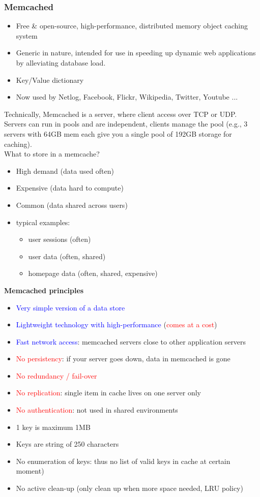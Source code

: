 \documentclass[10pt,a4paper]{article}
\begin{document}
\subsubsection{Memcached}
\begin{itemize}
	\item Free \& open-source, high-performance, distributed memory object caching system
	\item Generic in nature, intended for use in speeding up dynamic web applications by alleviating database load.
	\item Key/Value dictionary
	\item Now used by Netlog, Facebook, Flickr, Wikipedia, Twitter, Youtube ...
\end{itemize}
Technically, Memcached is a server, where client access over TCP or UDP. Servers can run in pools and are independent, clients manage the pool (e.g., 3 servers with 64GB mem each give you a single pool of 192GB storage for caching). \\
What to store in a memcache?
\begin{itemize}
	\item High demand (data used often)
	\item Expensive (data hard to compute)
	\item Common (data shared across users)
	\item typical examples:
	\begin{itemize}
		\item user sessions (often)
		\item user data (often, shared)
		\item homepage data (often, shared, expensive)
	\end{itemize}
\end{itemize}
\textbf{Memcached principles}
\begin{itemize}
	\item \textcolor{blue}{Very simple version of a data store}
	\item \textcolor{blue}{Lightweight technology with high-performance} (\textcolor{red}{comes at a cost})
 	\item \textcolor{blue}{Fast network access}: memcached servers close to other application servers
	\item \textcolor{red}{No persistency}: if your server goes down, data in memcached is gone
	\item \textcolor{red}{No redundancy / fail-over}
	\item \textcolor{red}{No replication}: single item in cache lives on one server only
	\item \textcolor{red}{No authentication}: not used in shared environments
	\item 1 key is maximum 1MB
	\item Keys are string of 250 characters
	\item No enumeration of keys: thus no list of valid keys in cache at certain moment)
	\item No active clean-up (only clean up when more space needed, LRU policy)
\end{itemize}
\end{document}
